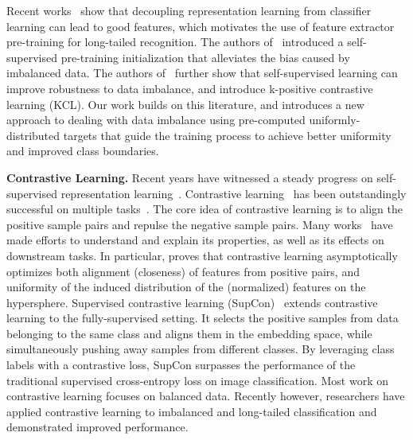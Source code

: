 Recent works~\cite{kang2019decoupling,zhou2020bbn,yang2021delving} show that decoupling representation learning from classifier learning can lead to good features, which motivates the use of feature extractor pre-training for long-tailed recognition. The authors of~\cite{yang2020rethinking} introduced a self-supervised pre-training initialization that alleviates the bias caused by imbalanced data. The authors of~\cite{kang2020exploring} further show that self-supervised learning can improve robustness to data imbalance, and introduce k-positive contrastive learning (KCL). 
Our work builds on this literature, and introduces a new approach to dealing with data imbalance using pre-computed uniformly-distributed targets that guide the training process to achieve better uniformity and improved class boundaries. 
 

\textbf{Contrastive Learning.}
Recent years have witnessed a steady progress on self-supervised representation learning~\cite{oord2018representation, doersch2015unsupervised,huang2017multi, noroozi2016unsupervised,fan2018end,fan2019controllable,fan2017adversarial,li2021self, fan2020learning,li2019making,fan2020home,zhao2018through,zhao2018rf}. Contrastive learning~\cite{he2020momentum,chen2020simple, chen2021exploring, khosla2020supervised,fan2021does, wang2020understanding, li2020making, grill2020bootstrap} has been outstandingly successful on multiple tasks~\cite{li2022rf, wu2021consistency, morgado2021robust}. The core idea of contrastive learning is to align the positive sample pairs and repulse the negative sample pairs. Many works~\cite{wang2020understanding, tian2020makes, li2020making, tian2021understanding, graf2021dissecting} have made efforts to understand and explain its properties, as well as its effects on downstream tasks. 
In particular, \cite{wang2020understanding} proves that contrastive learning asymptotically optimizes both
alignment (closeness) of features from positive pairs, and uniformity of the induced distribution of the (normalized) features on the hypersphere. 
 Supervised contrastive learning (SupCon)~\cite{khosla2020supervised} extends contrastive learning to the fully-supervised setting. It selects the positive samples from data belonging to the same class and aligns them in the embedding space, while simultaneously pushing away samples from different classes. By leveraging class labels with a contrastive loss, SupCon surpasses the performance  of the traditional supervised cross-entropy loss on image classification. Most work on contrastive learning focuses on balanced data. Recently however, researchers have applied contrastive learning to imbalanced and long-tailed classification and demonstrated improved performance\cite{kang2020exploring,yang2020rethinking}. 
 

